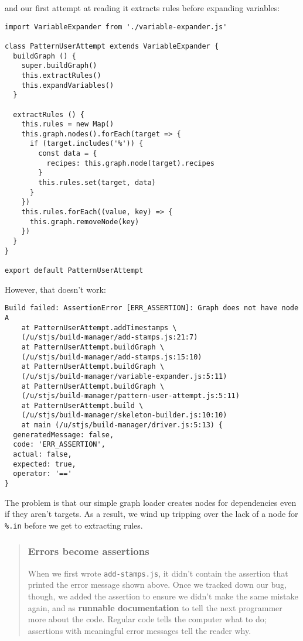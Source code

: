 \documentclass[krantzl]{krantz}
\newcommand{\glossref}[1]{\textbf{#1}}
\newenvironment{callout}{\savenotes\begin{tBox}\begin{quotation}\toggletrue{inbox}\renewcommand{\thempfootnote}{\arabic{footnote}}}{\end{quotation}\vspace{\baselineskip}\end{tBox}\togglefalse{inbox}\spewnotes}
\begin{document}
\noindent and our first attempt at reading it extracts rules before expanding variables:


\begin{lstlisting}[frame=tblr]
import VariableExpander from './variable-expander.js'

class PatternUserAttempt extends VariableExpander {
  buildGraph () {
    super.buildGraph()
    this.extractRules()
    this.expandVariables()
  }

  extractRules () {
    this.rules = new Map()
    this.graph.nodes().forEach(target => {
      if (target.includes('%')) {
        const data = {
          recipes: this.graph.node(target).recipes
        }
        this.rules.set(target, data)
      }
    })
    this.rules.forEach((value, key) => {
      this.graph.removeNode(key)
    })
  }
}

export default PatternUserAttempt
\end{lstlisting}



However,
that doesn’t work:


\begin{lstlisting}[frame=tblr,backgroundcolor=\color{black!5}]
Build failed: AssertionError [ERR_ASSERTION]: Graph does not have node A
    at PatternUserAttempt.addTimestamps \
    (/u/stjs/build-manager/add-stamps.js:21:7)
    at PatternUserAttempt.buildGraph \
    (/u/stjs/build-manager/add-stamps.js:15:10)
    at PatternUserAttempt.buildGraph \
    (/u/stjs/build-manager/variable-expander.js:5:11)
    at PatternUserAttempt.buildGraph \
    (/u/stjs/build-manager/pattern-user-attempt.js:5:11)
    at PatternUserAttempt.build \
    (/u/stjs/build-manager/skeleton-builder.js:10:10)
    at main (/u/stjs/build-manager/driver.js:5:13) {
  generatedMessage: false,
  code: 'ERR_ASSERTION',
  actual: false,
  expected: true,
  operator: '=='
}
\end{lstlisting}



\noindent The problem is that our simple graph loader creates nodes for dependencies even if they aren’t targets.
As a result,
we wind up tripping over the lack of a node for \texttt{\%.in} before we get to extracting rules.

\begin{callout}


\subsubsection*{Errors become assertions}


When we first wrote \texttt{add-stamps.js},
it didn’t contain the assertion
that printed the error message shown above.
Once we tracked down our bug,
though,
we added the assertion to ensure we didn’t make the same mistake again,
and as \glossref{runnable documentation}
to tell the next programmer more about the code.
Regular code tells the computer what to do;
assertions with meaningful error messages tell the reader why.

\end{callout}
\end{document}
